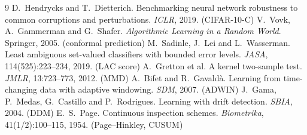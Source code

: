 \documentclass[11pt,a4paper]{article}
\begin{document}
\begin{thebibliography}{9}
 D.~Hendrycks and T.~Dietterich. Benchmarking neural network robustness to common corruptions and perturbations. \emph{ICLR}, 2019. (CIFAR-10-C)
 V.~Vovk, A.~Gammerman and G.~Shafer. \emph{Algorithmic Learning in a Random World}. Springer, 2005. (conformal prediction)
 M.~Sadinle, J.~Lei and L.~Wasserman. Least ambiguous set-valued classifiers with bounded error levels. \emph{JASA}, 114(525):223--234, 2019. (LAC score)
 A.~Gretton et al. A kernel two-sample test. \emph{JMLR}, 13:723--773, 2012. (MMD)
 A.~Bifet and R.~Gavald\`a. Learning from time-changing data with adaptive windowing. \emph{SDM}, 2007. (ADWIN)
 J.~Gama, P.~Medas, G.~Castillo and P.~Rodrigues. Learning with drift detection. \emph{SBIA}, 2004. (DDM)
 E.~S.~Page. Continuous inspection schemes. \emph{Biometrika}, 41(1/2):100--115, 1954. (Page--Hinkley, CUSUM)
\end{thebibliography}
\end{document}
